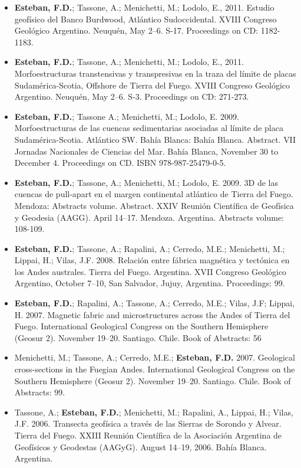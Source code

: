 \documentclass[11pt, a4paper]{article}
\begin{document}
\begin{itemize}
  \item \textbf{Esteban, F.D.}; Tassone, A.; Menichetti, M.; Lodolo, E., 2011. Estudio geofísico del Banco Burdwood, Atlántico Sudoccidental. XVIII Congreso Geológico Argentino. Neuquén, May 2--6. S-17. Proceedings on CD: 1182-1183.

  \item \textbf{Esteban, F.D.}; Tassone, A.; Menichetti, M.; Lodolo, E., 2011. Morfoestructuras transtensivas y transpresivas en la traza del límite de placas Sudamérica-Scotia, Offshore de Tierra del Fuego. XVIII Congreso Geológico Argentino. Neuquén, May 2--6. S-3. Proceedings on CD: 271-273.

  \item \textbf{Esteban, F.D.}; Tassone A.; Menichetti, M.; Lodolo, E. 2009. Morfoestructuras de las cuencas sedimentarias asociadas al límite de placa Sudamérica-Scotia. Atlántico SW. Bahía Blanca: Bahía Blanca. Abstract. VII Jornadas Nacionales de Ciencias del Mar. Bahía Blanca, November 30 to December 4. Proceedings on CD. ISBN 978-987-25479-0-5.

  \item \textbf{Esteban, F.D.}; Tassone, A.; Menichetti, M.; Lodolo, E. 2009. 3D de las cuencas de pull-apart en el margen continental atlántico de Tierra del Fuego. Mendoza: Abstracts volume. Abstract. XXIV Reunión Científica de Geofísica y Geodesia (AAGG). April 14--17. Mendoza. Argentina. Abstracts volume: 108-109.

  \item \textbf{Esteban, F.D.}; Tassone, A.; Rapalini, A.; Cerredo, M.E.; Menichetti, M.; Lippai, H.; Vilas, J.F. 2008. Relación entre fábrica magnética y tectónica en los Andes australes. Tierra del Fuego. Argentina. XVII Congreso Geológico Argentino, October 7--10, San Salvador, Jujuy, Argentina. Proceedings: 99.

  \item \textbf{Esteban, F.D.}; Rapalini, A.; Tassone, A.; Cerredo, M.E.; Vilas, J.F; Lippai, H. 2007. Magnetic fabric and microstructures across the Andes of Tierra del Fuego. International Geological Congress on the Southern Hemisphere (Geosur 2). November 19--20. Santiago. Chile. Book of Abstracts: 56

  \item Menichetti, M.; Tassone, A.; Cerredo, M.E.; \textbf{Esteban, F.D.} 2007. Geological cross-sections in the Fuegian Andes. International Geological Congress on the Southern Hemisphere (Geosur 2). November 19--20. Santiago. Chile. Book of Abstracts: 99.

  \item Tassone, A.; \textbf{Esteban, F.D.}; Menichetti, M.; Rapalini, A., Lippai, H.; Vilas, J.F. 2006. Transecta geofísica a través de las Sierras de Sorondo y Alvear. Tierra del Fuego. XXIII Reunión Científica de la Asociación Argentina de Geofísicos y Geodestas (AAGyG). August 14--19, 2006. Bahía Blanca. Argentina.
\end{itemize}
\end{document}
